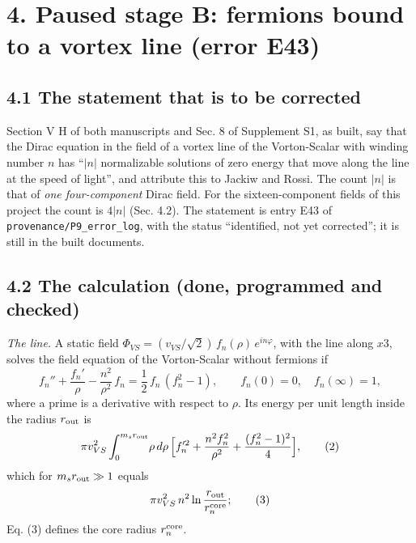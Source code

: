 \documentclass[
  10pt,
]{article}
\begin{document}
\hypertarget{paused-stage-b-fermions-bound-to-a-vortex-line-error-e43}{%
\section{4. Paused stage B: fermions bound to a vortex line (error
E43)}\label{paused-stage-b-fermions-bound-to-a-vortex-line-error-e43}}

\hypertarget{the-statement-that-is-to-be-corrected}{%
\subsection{4.1 The statement that is to be
corrected}\label{the-statement-that-is-to-be-corrected}}

Section V H of both manuscripts and Sec. 8 of Supplement S1, as built,
say that the Dirac equation in the field of a vortex line of the
Vorton-Scalar with winding number \(n\) has ``\(|n|\) normalizable
solutions of zero energy that move along the line at the speed of
light'', and attribute this to Jackiw and Rossi. The count \(|n|\) is
that of \emph{one four-component} Dirac field. For the sixteen-component
fields of this project the count is \(4|n|\) (Sec. 4.2). The statement
is entry E43 of \texttt{provenance/P9\_error\_log}, with the status
``identified, not yet corrected''; it is still in the built documents.

\hypertarget{the-calculation-done-programmed-and-checked}{%
\subsection{4.2 The calculation (done, programmed and
checked)}\label{the-calculation-done-programmed-and-checked}}

\emph{The line.} A static field
\(\Phi_{VS}=(v_{VS}/\sqrt2)\,f_n(\rho)\,e^{in\varphi}\), with the line
along \(x3\), solves the field equation of the Vorton-Scalar without
fermions if
\[f_n''+\frac{f_n'}{\rho}-\frac{n^2}{\rho^2}\,f_n=\frac12\,f_n\,(f_n^2-1),\qquad f_n(0)=0,\quad f_n(\infty)=1,\tag{1}\]
where a prime is a derivative with respect to \(\rho\). Its energy per
unit length inside the radius \(r_{\rm out}\) is
\[\pi v_{VS}^2\int_0^{m_sr_{\rm out}}\!\rho\,d\rho\,\Big[f_n'^2+\frac{n^2f_n^2}{\rho^2}+\frac{(f_n^2-1)^2}{4}\Big],\tag{2}\]
which for \(m_sr_{\rm out}\gg1\) equals
\[\pi v_{VS}^2\,n^2\ln\frac{r_{\rm out}}{r^{\rm core}_n};\tag{3}\] Eq.
(3) defines the core radius \(r^{\rm core}_n\).
\end{document}

